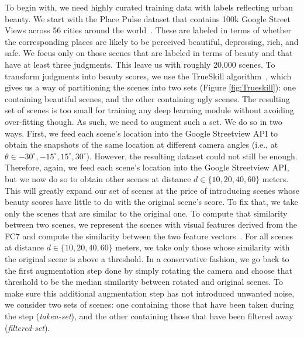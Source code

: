 To begin with, we need highly curated training data with labels reflecting urban beauty. We start with the  Place Pulse dataset that contains 100k Google Street Views across 56 cities around the world~\cite{dubey2016deep}. These are labeled in terms of whether the corresponding places are likely to be perceived beautiful, depressing, rich, and safe. We focus only on those scenes that are labeled in terms of beauty and that have at least three judgments. This leave us with roughly  20,000 scenes. To transform judgments into beauty scores, we use the TrueSkill algorithm~\cite{herbrich2007trueskill}, which gives us a way of partitioning the scenes into two sets (Figure \ref{fig:Trueskill}): one containing beautiful scenes, and the other containing ugly scenes. The resulting set of scenes is too small for training any deep learning module without avoiding over-fitting though. As such, we need to augment such a set. We do so in two ways. First, we feed each scene's location into the Google Streetview API to obtain  the snapshots of the same location at different camera angles (i.e., at $\theta \in {-30^{\circ}, -15^{\circ} , 15^{\circ} , 30^{\circ} }$). However, the resulting dataset could not still be enough. Therefore, again, we feed each scene's location into the Google Streetview API, but we now do so to obtain other scenes at  distance $d \in \{10,20,40,60\}$ meters.  This will greatly expand our set of scenes at the price of introducing scenes whose beauty scores have little to do with the original scene's score. To fix that, we take only the scenes that are similar to the original one. To compute that similarity between two scenes,
we represent the scenes with visual features derived from the FC7 and compute the similarity between the two feature vectors~\cite{}. For all  scenes at distance $d \in \{10,20,40,60\}$ meters,  we take only those whose similarity with the original scene is above a threshold. In a conservative fashion, we go back to the first augmentation step done by simply rotating the camera and choose that threshold to be the median similarity between rotated and original scenes. To make sure this additional augmentation step has not introduced unwanted noise, we consider  two sets of scenes: one containing those that have been taken during the step (\emph{taken-set}), and the other containing those that have been filtered away (\emph{filtered-set}). 


